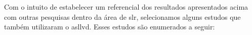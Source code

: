 
Com o intuito de estabelecer um referencial dos resultados apresentados acima com outras pesquisas dentro da área de \acrfull{slr}, selecionamos alguns estudos que também utilizaram o \acrshort{asllvd}. Esses estudos são enumerados a seguir:



